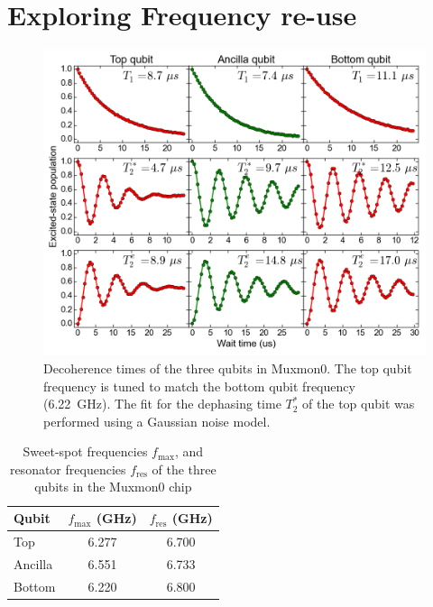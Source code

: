     \section{Exploring Frequency re-use}

      \begin{figure}[tb]
        \centering
        \includegraphics[width=\linewidth]{../Figures/Exploring frequency re-use/coherence_times.png}
        \caption{Decoherence times of the three qubits in Muxmon0. The top qubit frequency is tuned to match the bottom qubit frequency (\SI{6.22}{\giga \hertz}). The fit for the dephasing time $T_2^*$ of the top qubit was performed using a Gaussian noise model.}
        \label{fig:decoherence times Muxmon0}
      \end{figure}

      \begin{table}
        \begin{tabular}{l c c}
          \toprule
          Qubit  & $f_\text{max}$ (GHz) & $f_\text{res}$ (GHz)\\
          \midrule
          Top    & 6.277                & 6.700 \\
          Ancilla& 6.551                & 6.733 \\
          Bottom & 6.220                & 6.800 \\
          \bottomrule
        \end{tabular}
        \caption{Sweet-spot frequencies $f_\text{max}$, and resonator frequencies $f_\text{res}$ of the three qubits in the Muxmon0 chip}
        \label{tab:Muxmon0 qubit properties}
      \end{table}

